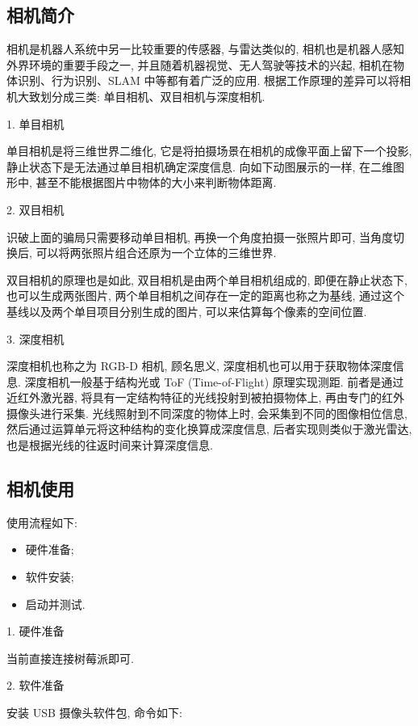 \documentclass[openany, fontset=windowsold]{ctexbook}
\theoremstyle{kaiti}
\theoremstyle{normal}
\begin{document}
\subsection{相机简介}

相机是机器人系统中另一比较重要的传感器, 与雷达类似的, 相机也是机器人感知外界环境的重要手段之一, 并且随着机器视觉、无人驾驶等技术的兴起, 相机在物体识别、行为识别、SLAM 中等都有着广泛的应用. 根据工作原理的差异可以将相机大致划分成三类: 单目相机、双目相机与深度相机.

1. 单目相机

单目相机是将三维世界二维化, 它是将拍摄场景在相机的成像平面上留下一个投影, 静止状态下是无法通过单目相机确定深度信息. 向如下动图展示的一样, 在二维图形中, 甚至不能根据图片中物体的大小来判断物体距离.

2. 双目相机

识破上面的骗局只需要移动单目相机, 再换一个角度拍摄一张照片即可, 当角度切换后, 可以将两张照片组合还原为一个立体的三维世界.

双目相机的原理也是如此, 双目相机是由两个单目相机组成的, 即便在静止状态下, 也可以生成两张图片, 两个单目相机之间存在一定的距离也称之为基线, 通过这个基线以及两个单目项目分别生成的图片, 可以来估算每个像素的空间位置.

3. 深度相机

深度相机也称之为 RGB-D 相机, 顾名思义, 深度相机也可以用于获取物体深度信息. 深度相机一般基于结构光或 ToF (Time-of-Flight) 原理实现测距. 前者是通过近红外激光器, 将具有一定结构特征的光线投射到被拍摄物体上, 再由专门的红外摄像头进行采集. 光线照射到不同深度的物体上时, 会采集到不同的图像相位信息, 然后通过运算单元将这种结构的变化换算成深度信息, 后者实现则类似于激光雷达, 也是根据光线的往返时间来计算深度信息.

\subsection{相机使用}

使用流程如下:

\begin{itemize}
  \item 硬件准备; 
  \item 软件安装; 
  \item 启动并测试.
\end{itemize}

1. 硬件准备

当前直接连接树莓派即可.

2. 软件准备

安装 USB 摄像头软件包, 命令如下:
\end{document}
